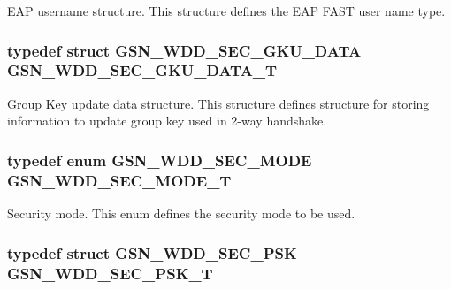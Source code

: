 EAP username structure. This structure defines the EAP FAST user name type. 

\hypertarget{a00604_af4786e836347b389816820cfbc8dc2a3}{
\subsubsection[{GSN\_\-WDD\_\-SEC\_\-GKU\_\-DATA\_\-T}]{\setlength{\rightskip}{0pt plus 5cm}typedef struct {\bf GSN\_\-WDD\_\-SEC\_\-GKU\_\-DATA} {\bf GSN\_\-WDD\_\-SEC\_\-GKU\_\-DATA\_\-T}}}
\label{a00604_af4786e836347b389816820cfbc8dc2a3}


Group Key update data structure. This structure defines structure for storing information to update group key used in 2-\/way handshake. 

\hypertarget{a00604_a99d01b68f744000378664161f66e73c9}{
\subsubsection[{GSN\_\-WDD\_\-SEC\_\-MODE\_\-T}]{\setlength{\rightskip}{0pt plus 5cm}typedef enum {\bf GSN\_\-WDD\_\-SEC\_\-MODE} {\bf GSN\_\-WDD\_\-SEC\_\-MODE\_\-T}}}
\label{a00604_a99d01b68f744000378664161f66e73c9}


Security mode. This enum defines the security mode to be used. 

\hypertarget{a00604_aa76fb465fe2fea1c3dbb630fefe969b8}{
\subsubsection[{GSN\_\-WDD\_\-SEC\_\-PSK\_\-T}]{\setlength{\rightskip}{0pt plus 5cm}typedef struct {\bf GSN\_\-WDD\_\-SEC\_\-PSK}  {\bf GSN\_\-WDD\_\-SEC\_\-PSK\_\-T}}}
\label{a00604_aa76fb465fe2fea1c3dbb630fefe969b8}


